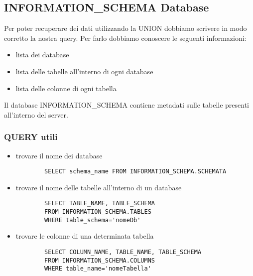 \documentclass[oneside,a4paper,11pt]{book}
\theoremstyle{italicstyle}
\theoremstyle{normStyle}
\begin{document}
\subsection{INFORMATION\_SCHEMA Database}
Per poter recuperare dei dati utilizzando la UNION dobbiamo scrivere in modo corretto la nostra query. Per farlo dobbiamo conoscere le seguenti informazioni:
\begin{itemize}
    \item lista dei database
    \item lista delle tabelle all'interno di ogni database
    \item lista delle colonne di ogni tabella
\end{itemize}
Il database INFORMATION\_SCHEMA contiene metadati sulle tabelle presenti all'interno del server.

\subsubsection{QUERY utili}
\begin{itemize}
    \item trovare il nome dei database
    \begin{verbatim}
        SELECT schema_name FROM INFORMATION_SCHEMA.SCHEMATA
    \end{verbatim}
    \item trovare il nome delle tabelle all'interno di un database
    \begin{verbatim}
        SELECT TABLE_NAME, TABLE_SCHEMA 
        FROM INFORMATION_SCHEMA.TABLES 
        WHERE table_schema='nomeDb'
    \end{verbatim}
    \item trovare le colonne di una determinata tabella
    \begin{verbatim}
        SELECT COLUMN_NAME, TABLE_NAME, TABLE_SCHEMA 
        FROM INFORMATION_SCHEMA.COLUMNS 
        WHERE table_name='nomeTabella'
    \end{verbatim}
\end{itemize}
\end{document}
